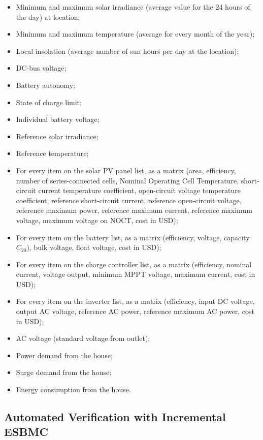 \begin{itemize}
\item Minimum and maximum solar irradiance (average value for the 24 hours of the day) at location;
\item Minimum and maximum temperature (average for every month of the year);
\item Local insolation (average number of sun hours per day at the location);
\item DC-bus voltage;
\item Battery autonomy;
\item State of charge limit;
\item Individual battery voltage;
\item Reference solar irradiance;
\item Reference temperature;
\item For every item on the solar PV panel list, as a matrix (area, efficiency, number of series-connected cells, Nominal Operating Cell Temperature, short-circuit current temperature coefficient, open-circuit voltage temperature coefficient, reference short-circuit current, reference open-circuit voltage, reference maximum power, reference maximum current, reference maximum voltage, maximum voltage on NOCT, cost in USD);
\item For every item on the battery list, as a matrix (efficiency, voltage, capacity $C_{20}$), bulk voltage, float voltage, cost in USD);
\item For every item on the charge controller list, as a matrix (efficiency, nominal current, voltage output, minimum MPPT voltage, maximum current, cost in USD);
\item For every item on the inverter list, as a matrix (efficiency, input DC voltage, output AC voltage, reference AC power, reference maximum AC power, cost in USD);
\item AC voltage (standard voltage from outlet);
\item Power demand from the house;
\item Surge demand from the house;
\item Energy consumption from the house.
\end{itemize}

\subsection{Automated Verification with Incremental ESBMC}


